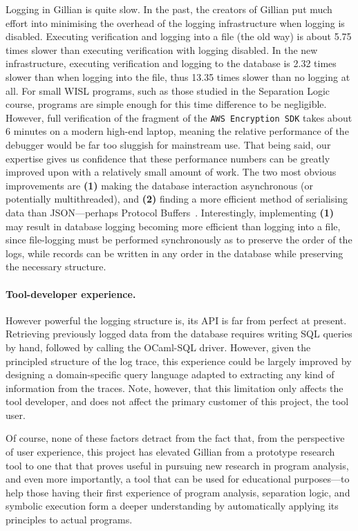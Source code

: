 Logging in Gillian is quite slow. In the past, the creators of Gillian put much
effort into minimising the overhead of the logging infrastructure when logging
is disabled. Executing verification and logging into a file (the old way) is
about 5.75\footnotemark[1]{} times slower than executing verification with
logging disabled. In the new infrastructure, executing verification and logging
to the database is 2.32\footnotemark[1]{} times slower than when logging into
the file, thus 13.35\footnotemark[1]{} times slower than no logging at all.
For small WISL programs, such as those studied in the Separation Logic course,
programs are simple enough for this time difference to be negligible. However,
full verification of the fragment of the \texttt{AWS Encryption SDK} takes about
6 minutes on a modern high-end laptop, meaning the relative performance of the
debugger would be far too sluggish for mainstream use.  That being said,
our expertise gives us confidence that these performance numbers can be
greatly improved upon with a relatively small amount of work.
The two most obvious improvements are \textbf{(1)} making the database
interaction asynchronous (or potentially multithreaded), and \textbf{(2)}
finding a more efficient method of serialising data than JSON---perhaps
Protocol Buffers~\cite{protobuf}. Interestingly, implementing \textbf{(1)} may
result in database logging becoming more efficient than logging into a file,
since file-logging must be performed synchronously as to preserve the order of
the logs, while records can be written in any order in the database while
preserving the necessary structure.

\paragraph{Tool-developer experience.}
However powerful the logging structure is, its API is far from perfect at
present. Retrieving previously logged data from the database requires writing
SQL queries by hand, followed by calling the OCaml-SQL driver. However, given
the principled structure of the log trace, this experience could be largely
improved by designing a domain-specific query language adapted to extracting any
kind of information from the traces. Note, however, that this limitation only
affects the tool developer, and does not affect the primary customer of this
project, the tool user.

Of course, none of these factors detract from the fact that, from the
perspective of user experience, this project has elevated Gillian from a
prototype research tool to one that that proves useful in pursuing new research
in program analysis, and even more importantly, a tool that can be used for
educational purposes---to help those having their first experience of
program analysis, separation logic, and symbolic execution form a deeper understanding by automatically applying its
principles to actual programs.

